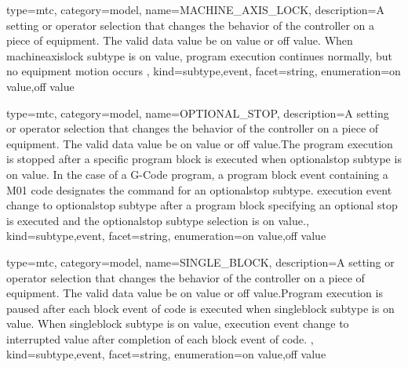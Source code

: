 {
  type=mtc,
  category=model,
  name={MACHINE\_AXIS\_LOCK},
  description={A setting or operator selection that changes the behavior of the controller on a piece of equipment. \newline The \gls{valid data value} \must be \gls{on value} or \gls{off value}. \newline When \gls{machineaxislock subtype} is \gls{on value}, program execution continues normally, but no equipment motion occurs },
  kind={subtype,event},
  facet={\gls{string}},
  enumeration={\gls{on value},\gls{off value}}
}


{
  type=mtc,
  category=model,
  name={OPTIONAL\_STOP},
  description={A setting or operator selection that changes the behavior of the controller on a piece of equipment. \newline The \gls{valid data value} \must be \gls{on value} or \gls{off value}.\newline The program execution is stopped after a specific program block is executed when \gls{optionalstop subtype} is \gls{on value}.    \newline In the case of a G-Code program, a program \gls{block event} containing a M01 code designates the command for an \gls{optionalstop subtype}. \newline \gls{execution event} \must change to \gls{optionalstop subtype} after a program block specifying an optional stop is executed and the \gls{optionalstop subtype} selection is \gls{on value}.},
  kind={subtype,event},
  facet={\gls{string}},
  enumeration={\gls{on value},\gls{off value}}
}


{
  type=mtc,
  category=model,
  name={SINGLE\_BLOCK},
  description={A setting or operator selection that changes the behavior of the controller on a piece of equipment. \newline The \gls{valid data value} \must be \gls{on value} or \gls{off value}.\newline Program execution is paused after each \gls{block event} of code is executed when \gls{singleblock subtype} is \gls{on value}.   \newline When \gls{singleblock subtype} is \gls{on value}, \gls{execution event} \must change to \gls{interrupted value} after completion of each \gls{block event} of code. },
  kind={subtype,event},
  facet={\gls{string}},
  enumeration={\gls{on value},\gls{off value}}
}


